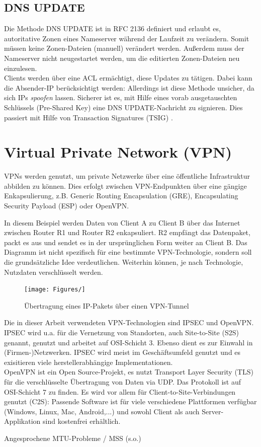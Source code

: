 \subsection{DNS UPDATE}
Die Methode DNS UPDATE ist in RFC 2136 definiert und erlaubt es, autoritative Zonen eines Nameserver während der Laufzeit zu verändern. Somit müssen keine Zonen-Dateien (manuell) verändert werden. Außerdem muss der Nameserver nicht neugestartet werden, um die editierten Zonen-Dateien neu einzulesen.\\
Clients werden über eine ACL ermächtigt, diese Updates zu tätigen. Dabei kann die Absender-IP berücksichtigt werden: Allerdings ist diese Methode unsicher, da sich IPs \textit{spoofen} lassen. Sicherer ist es, mit Hilfe eines vorab ausgetauschten Schlüssels (Pre-Shared Key) eine DNS UPDATE-Nachricht zu signieren. Dies passiert mit Hilfe von Transaction Signatures (TSIG) \cite[S.911-914]{Fall2011}.


\section{Virtual Private Network (VPN)}\label{vpn}
VPNs werden genutzt, um private Netzwerke über eine öffentliche Infrastruktur abbilden zu können. Dies erfolgt zwischen VPN-Endpunkten über eine gängige Enkapsulierung, z.B. Generic Routing Encapsulation (GRE), Encapsulating Security Payload (ESP) oder OpenVPN.

In diesem Beispiel werden Daten von Client A zu Client B über das Internet zwischen Router R1 und Router R2 enkapsuliert. R2 empfängt das Datenpaket, packt es aus und sendet es in der ursprünglichen Form weiter an Client B. Das Diagramm ist nicht spezifisch für eine bestimmte VPN-Technologie, sondern soll die grundsätzliche Idee verdeutlichen. Weiterhin können, je nach Technologie, Nutzdaten verschlüsselt werden. 

\begin{figure}[h]
  \centering
  \texttt{[image: Figures/]}
  \caption{Übertragung eines IP-Pakets über einen VPN-Tunnel}
  \label{grafik: vpn-example}
\end{figure}\FloatBarrier

Die in dieser Arbeit verwendeten VPN-Technologien sind IPSEC und OpenVPN. IPSEC wird u.a. für die Vernetzung von Standorten, auch Site-to-Site (S2S) genannt, genutzt und arbeitet auf OSI-Schicht 3. Ebenso dient es zur \glqq Einwahl\grqq{} in (Firmen-)Netzwerken.  IPSEC wird meist im Geschäftsumfeld genutzt und es exisitieren viele herstellerabhängige Implementationen.\\
OpenVPN ist ein Open Source-Projekt, es nutzt Transport Layer Security (TLS) für die verschlüsselte Übertragung von Daten via UDP. Das Protokoll ist auf OSI-Schicht 7 zu finden. Es wird vor allem für Client-to-Site-Verbindungen genutzt (C2S): Passende Software ist für viele verschiedene Plattformen verfügbar (Windows, Linux, Mac, Android,...) und sowohl Client als auch Server-Applikation sind kostenfrei erhältlich.

Angesprochene MTU-Probleme / MSS (s.o.)